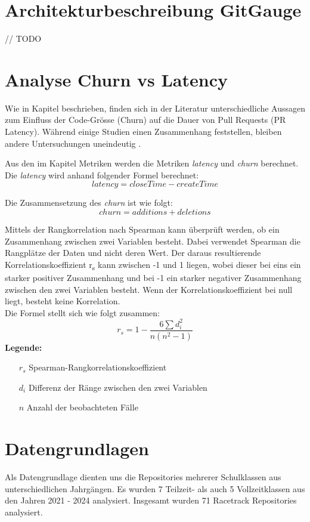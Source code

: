 \section{Architekturbeschreibung GitGauge}
// TODO 

\section{Analyse Churn vs Latency}
\label{sec:AnalyseChurnvsLatency}
Wie in Kapitel  beschrieben, finden sich in der Literatur unterschiedliche Aussagen zum Einfluss der Code-Grösse (Churn) auf die Dauer von Pull Requests (PR Latency). Während einige Studien einen Zusammenhang feststellen, bleiben andere Untersuchungen uneindeutig \parencite{hasan_understanding_2023}\parencite{kudrjavets_small_2022}.


Aus den im Kapitel  Metriken werden die Metriken \textit{latency} und \textit{churn} berechnet. Die \textit{latency} wird anhand folgender Formel berechnet:
\begin{equation}
latency = closeTime - createTime
\end{equation}

Die Zusammensetzung des \textit{churn} ist wie folgt:
\begin{equation}
churn = additions + deletions
\end{equation}

Mittels der Rangkorrelation nach Spearman kann überprüft werden, ob ein Zusammenhang zwischen zwei Variablen besteht. Dabei verwendet Spearman die Rangplätze der Daten und nicht deren Wert. Der daraus resultierende Korrelationskoeffizient r\textsubscript{s} kann zwischen -1 und 1 liegen, wobei dieser bei eins ein starker positiver Zusammenhang und bei -1 ein starker negativer Zusammenhang zwischen den zwei Variablen besteht. Wenn der Korrelationskoeffizient bei null liegt, besteht keine Korrelation. \parencite{noauthor_t-test_nodate}  \\
Die Formel \parencite{noauthor_t-test_nodate} stellt sich wie folgt zusammen: 
\begin{equation}
r_s = 1 - \frac{6 \sum d_i^2}{n(n^2 - 1)}
\end{equation}
\label{eqn:spearman}
\noindent\textbf{Legende:}
\begin{itemize}
  \item [$r_s$] Spearman-Rangkorrelationskoeffizient
  \item[$d_i$] Differenz der Ränge zwischen den zwei Variablen 
  \item[$n$] Anzahl der beobachteten Fälle
\end{itemize}


\section{Datengrundlagen}
\label{sec:Datengrundlagen}
Als Datengrundlage dienten uns die Repositories mehrerer Schulklassen aus unterschiedlichen Jahrgängen. Es wurden 7 Teilzeit- als auch 5 Vollzeitklassen aus den Jahren 2021 - 2024 analysiert. Insgesamt wurden 71 Racetrack Repositories analysiert. 


